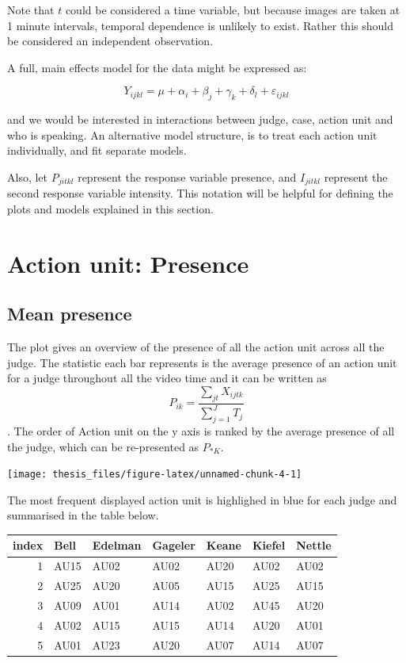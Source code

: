 \documentclass{monashthesis}
\begin{document}
Note that \(t\) could be considered a time variable, but because images are taken at 1 minute intervals, temporal dependence is unlikely to exist. Rather this should be considered an independent observation.

A full, main effects model for the data might be expressed as:

\[Y_{ijkl} = \mu + \alpha_i + \beta_j + \gamma_k + \delta_l + \varepsilon_{ijkl}\]

\noindent and we would be interested in interactions between judge, case, action unit and who is speaking. An alternative model structure, is to treat each action unit individually, and fit separate models.

Also, let \(P_{jitkl}\) represent the response variable presence, and \(I_{jitkl}\) represent the second response variable intensity. This notation will be helpful for defining the plots and models explained in this section.

\hypertarget{action-unit-presence}{%
\section{Action unit: Presence}\label{action-unit-presence}}

\hypertarget{mean-presence}{%
\subsection{Mean presence}\label{mean-presence}}

The plot gives an overview of the presence of all the action unit across all the judge. The statistic each bar represents is the average presence of an action unit for a judge throughout all the video time and it can be written as \[P_{ik} = \frac{\sum_{jt}X_{ijtk}}{\sum_{j = 1}^JT_j}\]. The order of Action unit on the y axis is ranked by the average presence of all the judge, which can be re-presented as \(P_{* K}\).

\texttt{[image: thesis\_files/figure-latex/unnamed-chunk-4-1]}

The most frequent displayed action unit is highlighed in blue for each judge and summarised in the table below.

\begin{tabular}{r|l|l|l|l|l|l}
\hline
index & Bell & Edelman & Gageler & Keane & Kiefel & Nettle\\
\hline
1 & AU15 & AU02 & AU02 & AU20 & AU02 & AU02\\
\hline
2 & AU25 & AU20 & AU05 & AU15 & AU25 & AU15\\
\hline
3 & AU09 & AU01 & AU14 & AU02 & AU45 & AU20\\
\hline
4 & AU02 & AU15 & AU15 & AU14 & AU20 & AU01\\
\hline
5 & AU01 & AU23 & AU20 & AU07 & AU14 & AU07\\
\hline
\end{tabular}
\end{document}
